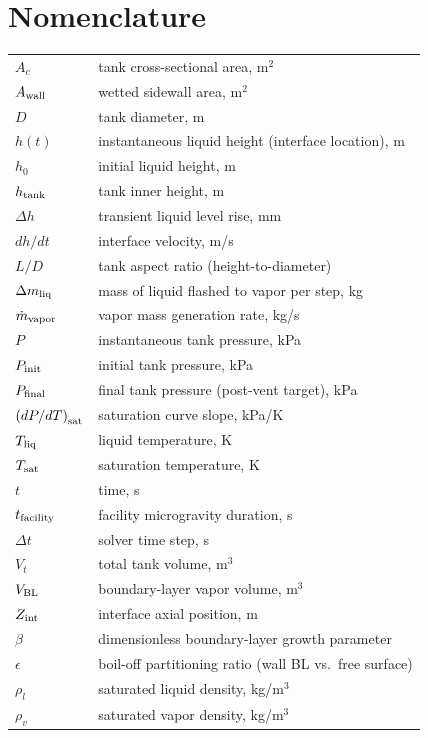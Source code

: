 \documentclass[conf]{new-aiaa}
\begin{document}
\section*{Nomenclature}
\begin{tabular}{ll}
$A_c$ & tank cross-sectional area, m$^2$ \\
$A_{\rm wall}$ & wetted sidewall area, m$^2$ \\
$D$ & tank diameter, m \\
$h(t)$ & instantaneous liquid height (interface location), m \\
$h_0$ & initial liquid height, m \\
$h_{\rm tank}$ & tank inner height, m \\
$\Delta h$ & transient liquid level rise, mm \\
$dh/dt$ & interface velocity, m/s \\
$L/D$ & tank aspect ratio (height-to-diameter) \\
$\Delta m_{\rm liq}$ & mass of liquid flashed to vapor per step, kg \\
$\dot{m}_{\rm vapor}$ & vapor mass generation rate, kg/s \\
$P$ & instantaneous tank pressure, kPa \\
$P_{\rm init}$ & initial tank pressure, kPa \\
$P_{\rm final}$ & final tank pressure (post-vent target), kPa \\
$\left(dP/dT\right)_{\rm sat}$ & saturation curve slope, kPa/K \\
$T_{\rm liq}$ & liquid temperature, K \\
$T_{\rm sat}$ & saturation temperature, K \\
$t$ & time, s \\
$t_{\rm facility}$ & facility microgravity duration, s \\
$\Delta t$ & solver time step, s \\
$V_t$ & total tank volume, m$^3$ \\
$V_{\rm BL}$ & boundary-layer vapor volume, m$^3$ \\
$Z_{\rm int}$ & interface axial position, m \\
$\beta$ & dimensionless boundary-layer growth parameter \\
$\epsilon$ & boil-off partitioning ratio (wall BL vs.\ free surface) \\
$\rho_l$ & saturated liquid density, kg/m$^3$ \\
$\rho_v$ & saturated vapor density, kg/m$^3$ \\
\end{tabular}
\end{document}
